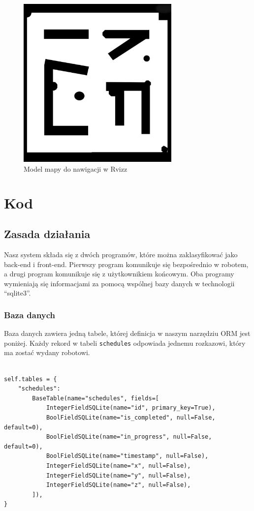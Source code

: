 \documentclass[12pt]{article}
\newcommand{\vsp}{\vspace{0.5cm}}
\begin{document}
\begin{figure}[!htb]
    \centering
    \includegraphics[height=8.5cm]{./images/rviz.png}
    \caption{Model mapy do nawigacji w Rvizz}
\end{figure}



\clearpage\newpage
\section{Kod}

\subsection{Zasada działania}

\vsp 
Nasz system składa się z dwóch programów, które można zaklasyfikować jako back-end i front-end. Pierwszy program komunikuje się bezpośrednio w robotem, a drugi program komunikuje się z użytkownikiem końcowym. Oba programy wymieniają się informacjami za pomocą wspólnej bazy danych w technologii ``sqlite3''. 

\vsp
\subsubsection*{Baza danych}

\noindent Baza danych zawiera jedną tabele, której definicja w naszym narzędziu ORM jest poniżej. Każdy rekord w tabeli \texttt{schedules} odpowiada jednemu rozkazowi, który ma zostać wydany robotowi.

\vsp\vsp

\begin{lstlisting}

self.tables = {
    "schedules":
        BaseTable(name="schedules", fields=[
            IntegerFieldSQLite(name="id", primary_key=True),
            BoolFieldSQLite(name="is_completed", null=False, default=0),
            BoolFieldSQLite(name="in_progress", null=False, default=0),
            BoolFieldSQLite(name="timestamp", null=False),
            IntegerFieldSQLite(name="x", null=False),
            IntegerFieldSQLite(name="y", null=False),
            IntegerFieldSQLite(name="z", null=False),
        ]),
}

\end{lstlisting}
\end{document}
